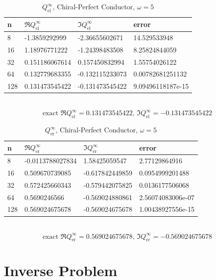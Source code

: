 \begin{table}
  \centering
  \renewcommand{\arraystretch}{1.1}
  \caption{$Q_\text{el}^\infty$, Chiral-Perfect Conductor, $\omega=5$}
  \begin{tabular}{@{}llll@{}}
    \toprule
    n & $\Re{Q_\text{el}^\infty}$ & $\Im{Q_\text{el}^\infty}$ & error \\
    \midrule
8 & -1.3859292999 & -2.36655602671 & 14.529533948\\ 
16 & 1.18976771222 & -1.24398483508 & 8.25824844059\\ 
32 & 0.151186067614 & 0.157450832994 & 1.55754026122\\ 
64 & 0.132779683355 & -0.132115233073 & 0.00782681251132\\ 
128 & 0.131473545422 & -0.131473545422 & 9.09496118187e-15\\ 
    \bottomrule
  \end{tabular}
  \\ 
  $$\text{exact }\Re{Q_\text{el}^\infty}=0.131473545422,\,\Im{Q_\text{el}^\infty}=-0.131473545422$$  
\end{table}

\begin{table}
  \centering
  \renewcommand{\arraystretch}{1.1}
  \caption{$Q_\text{er}^\infty$, Chiral-Perfect Conductor, $\omega=5$}
  \begin{tabular}{@{}llll@{}}
    \toprule
    n & $\Re{Q_\text{er}^\infty}$ & $\Im{Q_\text{er}^\infty}$ & error \\
    \midrule
8 & -0.0113788027834 & 1.58425059547 & 2.77129864916\\ 
16 & 0.509670739085 & -0.617842449859 & 0.0954999201488\\ 
32 & 0.572425660343 & -0.579442075825 & 0.0136177506068\\ 
64 & 0.5690246566 & -0.569024880861 & 2.56074083006e-07\\ 
128 & 0.569024675678 & -0.569024675678 & 1.00438927556e-15\\ 
    \bottomrule
  \end{tabular}
  \\ 
  $$\text{exact }\Re{Q_\text{er}^\infty}=0.569024675678,\,\Im{Q_\text{er}^\infty}=-0.569024675678$$  
\end{table}

\section{Inverse Problem}


